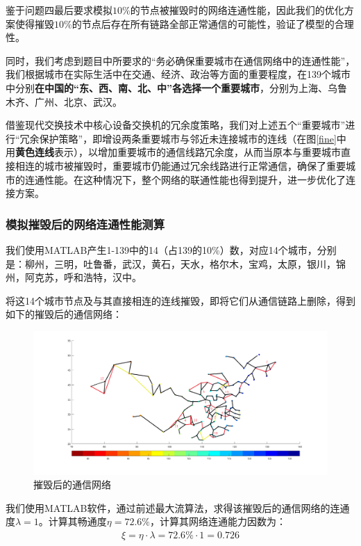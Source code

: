 \documentclass{article}
\begin{document}
鉴于问题四最后要求模拟$10\%$的节点被摧毁时的网络连通性能\cite{岳超-410}，因此我们的优化方案使得摧毁$10\%$的节点后存在所有链路全部正常通信的可能性，验证了模型的合理性。

同时，我们考虑到题目中所要求的“务必确保重要城市在通信网络中的连通性能”，我们根据城市在实际生活中在交通、经济、政治等方面的重要程度，在139个城市中分别\textbf{在中国的“东、西、南、北、中”各选择一个重要城市}，分别为上海、乌鲁木齐、广州、北京、武汉。

借鉴现代交换技术中核心设备交换机的冗余度策略，我们对上述五个“重要城市”进行“冗余保护策略”，即增设两条重要城市与邻近未连接城市的连线（在图\ref{fine}中用\textbf{黄色连线}表示），以增加重要城市的通信线路冗余度，从而当原本与重要城市直接相连的城市被摧毁时，重要城市仍能通过冗余线路进行正常通信，确保了重要城市的连通性能。在这种情况下，整个网络的联通性能也得到提升，进一步优化了连接方案。

\subsubsection{模拟摧毁后的网络连通性能测算}
\label{模拟摧毁后的网络连通性能测算}

我们使用MATLAB产生1-139中的14（占139的10\%）数，对应14个城市，分别是：柳州，三明，吐鲁番，武汉，黄石，天水，格尔木，宝鸡，太原，银川，锦州，阿克苏，呼和浩特，汉中。

将这14个城市节点及与其直接相连的连线摧毁，即将它们从通信链路上删除，得到如下的摧毁后的通信网络：

\begin{figure}[htpb]
	\centering
	\includegraphics[width=0.8\linewidth]{44.png}
	\caption{摧毁后的通信网络}
	\label{fig:摧毁后的通信网络}
\end{figure}

我们使用MATLAB软件，通过前述最大流算法，求得该摧毁后的通信网络的连通度$\lambda=1$。计算其畅通度$\eta=72.6\%$，计算其网络连通能力因数为：
\begin{align}
	\xi=\eta \cdot \lambda=72.6\% \cdot 1=0.726
\end{align}
\end{document}
